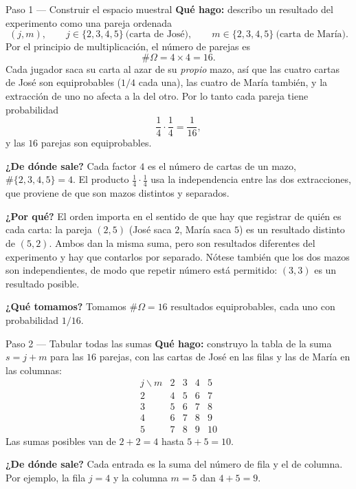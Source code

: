 \documentclass[11pt]{article}
\begin{document}
\begin{sol}
\begin{paso}{Paso 1 --- Construir el espacio muestral}
\textbf{Qué hago:} describo un resultado del experimento como una pareja ordenada
\[
(j,m),\qquad j\in\{2,3,4,5\}\ \text{(carta de José)},\qquad m\in\{2,3,4,5\}\ \text{(carta de
María)} .
\]
Por el principio de multiplicación, el número de parejas es
\[
\#\Omega=4\times 4=16 .
\]
Cada jugador saca su carta al azar de su \emph{propio} mazo, así que las cuatro cartas de
José son equiprobables ($1/4$ cada una), las cuatro de María también, y la extracción de uno
no afecta a la del otro. Por lo tanto cada pareja tiene probabilidad
\[
\frac14\cdot\frac14=\frac{1}{16},
\]
y las $16$ parejas son equiprobables.

\textbf{¿De dónde sale?} Cada factor $4$ es el número de cartas de un mazo,
$\#\{2,3,4,5\}=4$. El producto $\frac14\cdot\frac14$ usa la independencia entre las dos
extracciones, que proviene de que son mazos distintos y separados.

\textbf{¿Por qué?} El orden importa en el sentido de que hay que registrar de quién es cada
carta: la pareja $(2,5)$ (José saca $2$, María saca $5$) es un resultado distinto de $(5,2)$.
Ambos dan la misma suma, pero son resultados diferentes del experimento y hay que contarlos
por separado. Nótese también que los dos mazos son independientes, de modo que repetir número
está permitido: $(3,3)$ es un resultado posible.

\textbf{¿Qué tomamos?} Tomamos $\#\Omega=16$ resultados equiprobables, cada uno con
probabilidad $1/16$.
\end{paso}

\begin{paso}{Paso 2 --- Tabular todas las sumas}
\textbf{Qué hago:} construyo la tabla de la suma $s=j+m$ para las $16$ parejas, con las cartas
de José en las filas y las de María en las columnas:
\[
\begin{array}{c|cccc}
 j\backslash m & 2 & 3 & 4 & 5\\\hline
 2 & 4 & 5 & 6 & 7\\
 3 & 5 & 6 & 7 & 8\\
 4 & 6 & 7 & 8 & 9\\
 5 & 7 & 8 & 9 & 10
\end{array}
\]
Las sumas posibles van de $2+2=4$ hasta $5+5=10$.

\textbf{¿De dónde sale?} Cada entrada es la suma del número de fila y el de columna. Por
ejemplo, la fila $j=4$ y la columna $m=5$ dan $4+5=9$.


\end{paso}
\end{sol}
\end{document}
